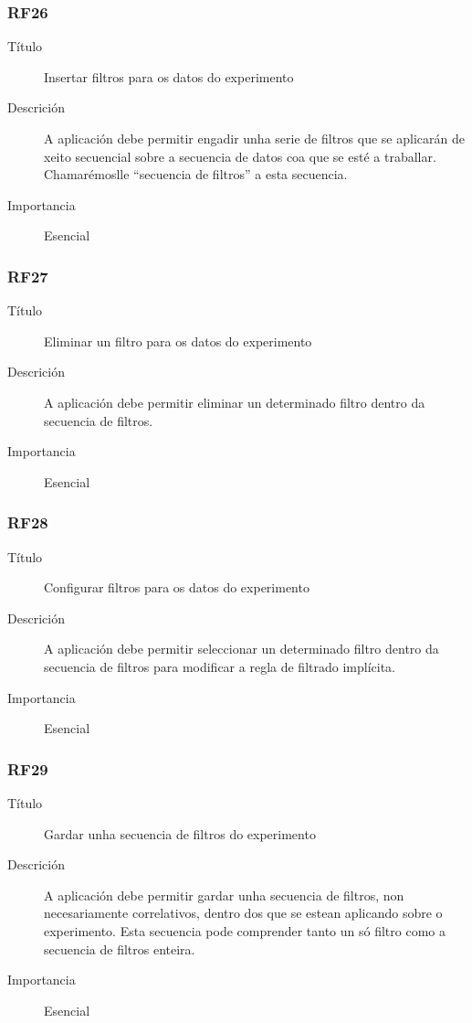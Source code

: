 \subsubsection*{RF26}
\begin{description}
\item[Título] \hfill
Insertar filtros para os datos do experimento
\item[Descrición] \hfill
A aplicación debe permitir engadir unha serie de filtros que se aplicarán de xeito secuencial sobre a secuencia de datos coa que se esté a traballar. Chamarémoslle ``secuencia de filtros'' a esta secuencia.
\item[Importancia] \hfill
Esencial
\end{description}

\subsubsection*{RF27}
\begin{description}
\item[Título] \hfill
Eliminar un filtro para os datos do experimento
\item[Descrición] \hfill
A aplicación debe permitir eliminar un determinado filtro dentro da secuencia de filtros.
\item[Importancia] \hfill
Esencial
\end{description}

\subsubsection*{RF28}
\begin{description}
\item[Título] \hfill
Configurar filtros para os datos do experimento
\item[Descrición] \hfill
A aplicación debe permitir seleccionar un determinado filtro dentro da secuencia de filtros para modificar a regla de filtrado implícita.
\item[Importancia] \hfill
Esencial
\end{description}

\subsubsection*{RF29}
\begin{description}
\item[Título] \hfill
Gardar unha secuencia de filtros do experimento
\item[Descrición] \hfill
A aplicación debe permitir gardar unha secuencia de filtros, non necesariamente correlativos, dentro dos que se estean aplicando sobre o experimento. Esta secuencia pode comprender tanto un só filtro como a secuencia de filtros enteira.
\item[Importancia] \hfill
Esencial
\end{description}

